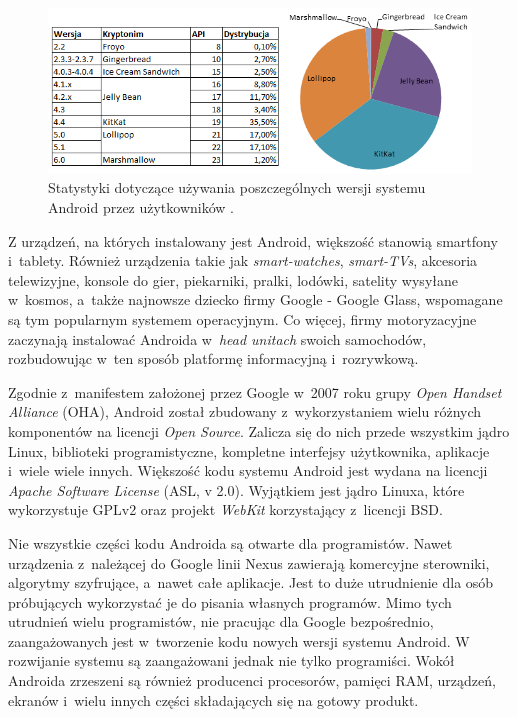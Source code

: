 \begin{figure}[!htb]
    \centering
    \includegraphics[width=16cm]{imgs/ch2_android_udzial_3pl.png}
    \caption
{Statystyki dotyczące używania poszczególnych wersji systemu Android przez użytkowników \cite{website:android:spidersweb}.}
    \label{fig:android_udzial_wersje}
\end{figure} 

Z urządzeń, na których instalowany jest Android, większość stanowią smartfony i~tablety. Również urządzenia takie jak \textit{smart-watches}, \textit{smart-TVs}, akcesoria telewizyjne, konsole do gier, piekarniki, pralki, lodówki, satelity wysyłane w~kosmos, a~także najnowsze dziecko firmy Google - Google Glass, wspomagane są tym popularnym systemem operacyjnym. Co więcej, firmy motoryzacyjne zaczynają instalować Androida w~\textit{head unitach} swoich samochodów, rozbudowując w~ten sposób platformę informacyjną i~rozrywkową.

Zgodnie z~manifestem założonej przez Google w~2007 roku grupy \textit{Open Handset Alliance} (OHA), Android został zbudowany z~wykorzystaniem wielu różnych komponentów na licencji \textit{Open Source}. Zalicza się do nich przede wszystkim jądro Linux, biblioteki programistyczne, kompletne interfejsy użytkownika, aplikacje i~wiele wiele innych. Większość kodu systemu Android jest wydana na licencji \textit{Apache Software License} (ASL, v 2.0). Wyjątkiem jest jądro Linuxa, które wykorzystuje GPLv2 oraz projekt \textit{WebKit} korzystający z~licencji BSD. 

Nie wszystkie części kodu Androida są otwarte dla programistów. Nawet urządzenia z~należącej do Google linii Nexus zawierają komercyjne sterowniki, algorytmy szyfrujące, a~nawet całe aplikacje. Jest to duże utrudnienie dla osób próbujących wykorzystać je do pisania własnych programów. Mimo tych utrudnień wielu programistów, nie pracując dla Google bezpośrednio, zaangażowanych jest w~tworzenie kodu nowych wersji systemu Android. W rozwijanie systemu są zaangażowani jednak nie tylko programiści. Wokół Androida zrzeszeni są również producenci procesorów, pamięci RAM, urządzeń, ekranów i~wielu innych części składających się na gotowy produkt.

